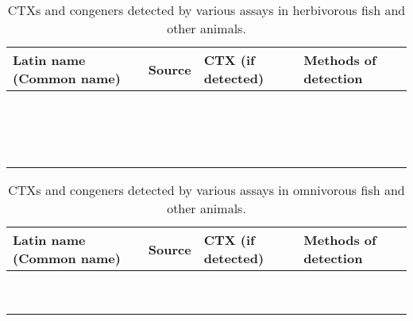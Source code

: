 \documentclass[12pt]{article}
\begin{document}
\begin{sidewaystable}[!htbp]
\caption{CTXs and congeners detected by various assays in herbivorous fish and other animals.}
\begin{tabular}{ |  p{4.5cm} | p{5cm} | p{4.5cm} | p{5cm} | }
\hline
\textbf{Latin name (Common name)} & \textbf{Source} & \textbf{CTX (if detected)} & \textbf{Methods of detection} \\
\hline
  &  &  & \\
\hline
  &  &  & \\
\hline
  &  &  & \\
\hline
  &  &  & \\
\hline
  &  &  & \\
\hline
  &  &  & \\
\hline
  &  &  & \\
\hline
  &  &  & \\
\hline
  &  &  & \\
\hline
  &  &  & \\
\hline
  &  &  & \\
\hline
  &  &  & \\
\hline
  &  &  & \\
\hline
  &  &  & \\
\hline
  &  &  & \\
\hline
  &  &  & \\
\hline
\end{tabular}
\end{sidewaystable}

\begin{sidewaystable}[!htbp]
\caption{CTXs and congeners detected by various assays in omnivorous fish and other animals.}
\begin{tabular}{ |  p{4.5cm} | p{5cm} | p{4.5cm} | p{5cm} | }
\hline
\textbf{Latin name (Common name)} & \textbf{Source} & \textbf{CTX (if detected)} & \textbf{Methods of detection} \\
\hline
  &  &  & \\
\hline
  &  &  & \\
\hline
  &  &  & \\
\hline
  &  &  & \\
\hline
  &  &  & \\
\hline
  &  &  & \\
\hline
  &  &  & \\
\hline
  &  &  & \\
\hline
  &  &  & \\
\hline
\end{tabular}
\end{sidewaystable}
\end{document}
